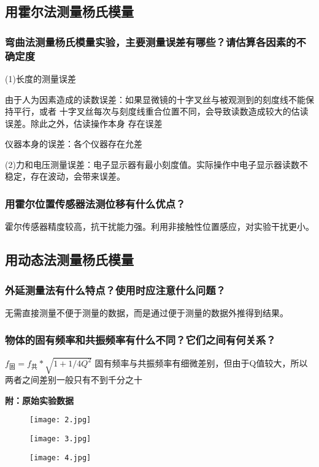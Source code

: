 \documentclass[12pt,a4paper]{article}
\begin{document}
\subsection{用霍尔法测量杨氏模量}
    \subsubsection{弯曲法测量杨氏模量实验，主要测量误差有哪些？请估算各因素的不确定度}
    (1)长度的测量误差\par
    由于人为因素造成的读数误差：如果显微镜的十字叉丝与被观测到的刻度线不能保持平行，或者
    十字叉丝每次与刻度线重合位置不同，会导致读数造成较大的估读误差。除此之外，估读操作本身
    存在误差\par
    仪器本身的误差：各个仪器存在允差\par
    (2)力和电压测量误差：电子显示器有最小刻度值。实际操作中电子显示器读数不稳定，存在波动，会带来误差。
    \subsubsection{用霍尔位置传感器法测位移有什么优点？}
    霍尔传感器精度较高，抗干扰能力强。利用非接触性位置感应，对实验干扰更小。
\subsection{用动态法测量杨氏模量}

\subsubsection{外延测量法有什么特点？使用时应注意什么问题？}
无需直接测量不便于测量的数据，而是通过便于测量的数据外推得到结果。

\subsubsection{物体的固有频率和共振频率有什么不同？它们之间有何关系？}
$f_固=f_共*\sqrt{1+1/4{Q^2}}$
固有频率与共振频率有细微差别，但由于Q值较大，所以两者之间差别一般只有不到千分之十
   


\textbf{附：原始实验数据}
\begin{figure}[H]
    \centering
    \texttt{[image: 2.jpg]}
\end{figure}
\begin{figure}[H]
    \centering
    \texttt{[image: 3.jpg]}
\end{figure}
\begin{figure}[H]
    \centering
    \texttt{[image: 4.jpg]}
\end{figure}
\end{document}

